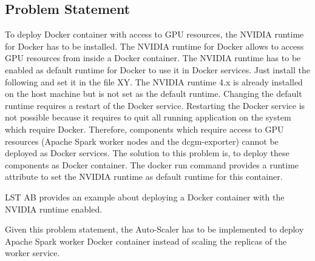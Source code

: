 \subsection{Problem Statement}
To deploy Docker container with access to GPU resources, the NVIDIA runtime for Docker has to be installed.
The NVIDIA runtime for Docker allows to access GPU resources from inside a Docker container. 
The NVIDIA runtime has to be enabled as default runtime for Docker to use it in Docker services.
Just install the following and set it in the file XY.
The NVIDIA runtime 4.x is already installed on the host machine but is not set as the default runtime.
Changing the default runtime requires a restart of the Docker service. Restarting the Docker service is not possible because it requires to quit all running application on the system which require Docker. Therefore, components which require access to GPU resources (Apache Spark worker nodes and the dcgm-exporter) cannot be deployed as Docker services.
The solution to this problem is, to deploy these components as Docker container. The docker run command provides a runtime attribute to set the NVIDIA runtime as default runtime for this container.

LST AB provides an example about deploying a Docker container with the NVIDIA runtime enabled.


Given this problem statement, the Auto-Scaler has to be implemented to deploy Apache Spark worker Docker container instead of scaling the replicas of the worker service.





